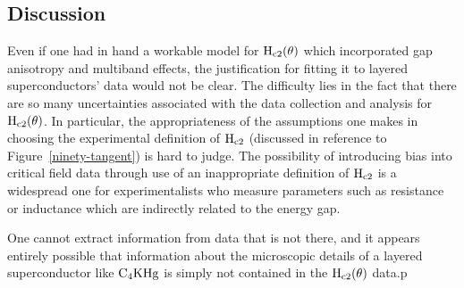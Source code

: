 \subsection{Discussion}
\label{angdep:disc}


        Even if one had in hand  a workable model  for $\rm H_{c2}(\theta)$
which incorporated gap anisotropy and  multiband effects, the justification
for  fitting it to layered  superconductors' data would not  be clear.  The
difficulty lies in the fact that there are so many uncertainties associated
with  the data  collection and  analysis   for   $\rm H_{c2}(\theta)$.   In
particular, the  appropriateness of the  assumptions one makes  in choosing
the   experimental definition of $\rm  H_{c2}$   (discussed in reference to
Figure~\ref{ninety-tangent}) is    hard  to   judge.   The   possibility   of
introducing bias into critical  field  data through use of an inappropriate
definition of $\rm H_{c2}$ is  a  widespread  one for experimentalists  who
measure  parameters such as resistance  or  inductance which are indirectly
related to the energy gap.

One cannot   extract
information from data that is not  there, and  it appears entirely possible
that information about  the microscopic details  of a layered superconductor
like $\rm  C_4KHg $ is  simply not  contained in  the $\rm  H_{c2}(\theta)$
data.p
